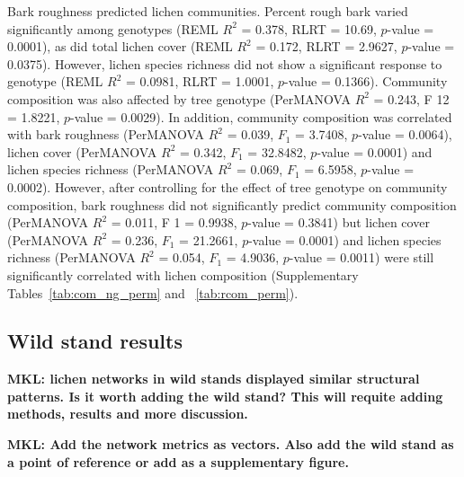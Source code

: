 \documentclass[9pt,twocolumn,twoside,lineno]{pnas-new}
\begin{document}
{Bark roughness predicted lichen communities. Percent rough bark varied
significantly among genotypes (REML $R^2$ = 0.378, RLRT = 10.69,
$p$-value = 0.0001), as did total lichen cover (REML $R^2$ = 0.172,
RLRT = 2.9627, $p$-value = 0.0375). However, lichen species richness
did not show a significant response to genotype (REML $R^2$ = 0.0981,
RLRT = 1.0001, $p$-value = 0.1366). Community composition was also
affected by tree genotype (PerMANOVA $R^2$ = 0.243, F 12 = 1.8221,
$p$-value = 0.0029). In addition, community composition was correlated
with bark roughness (PerMANOVA $R^2$ = 0.039, $F_1$ = 3.7408,
$p$-value = 0.0064), lichen cover (PerMANOVA $R^2$ = 0.342, $F_1$ =
32.8482, $p$-value = 0.0001) and lichen species richness (PerMANOVA
$R^2$ = 0.069, $F_1$ = 6.5958, $p$-value = 0.0002). However, after
controlling for the effect of tree genotype on community composition,
bark roughness did not significantly predict community composition
(PerMANOVA $R^2$ = 0.011, F 1 = 0.9938, $p$-value = 0.3841) but lichen
cover (PerMANOVA $R^2$ = 0.236, $F_1$ = 21.2661, $p$-value = 0.0001)
and lichen species richness (PerMANOVA $R^2$ = 0.054, $F_1$ = 4.9036,
$p$-value = 0.0011) were still significantly correlated with lichen
composition (Supplementary Tables~\ref{tab:com_ng_perm} and
~\ref{tab:rcom_perm}).


\subsection{Wild stand results}

\textbf{MKL: lichen networks in wild stands displayed similar
  structural patterns. Is it worth adding the wild stand? This will
  requite adding methods, results and more discussion.}

\textbf{MKL: Add the network metrics as vectors. Also add the wild
  stand as a point of reference or add as a supplementary figure.}

}
\end{document}
